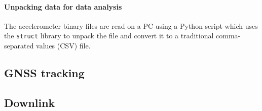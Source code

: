 \documentclass[a4paper,11pt]{article}
\begin{document}
\paragraph{Unpacking data for data analysis}

The accelerometer binary files are read on a PC using a Python script which uses the \texttt{struct} library to unpack the file and convert it to a traditional comma-separated values (CSV) file.

\subsection{GNSS tracking}

\subsection{Downlink}






\end{document}
